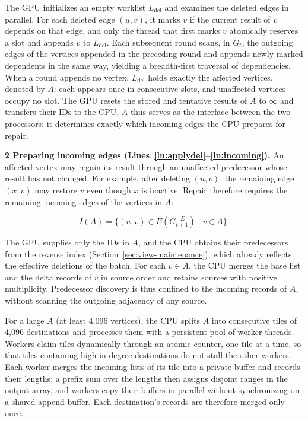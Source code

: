 The GPU initializes an empty worklist $L_{\mathrm{del}}$ and examines the deleted edges in parallel. For each deleted edge $(u,v)$, it marks $v$ if the current result of $v$ depends on that edge, and only the thread that first marks $v$ atomically reserves a slot and appends $v$ to $L_{\mathrm{del}}$. Each subsequent round scans, in $G_t$, the outgoing edges of the vertices appended in the preceding round and appends newly marked dependents in the same way, yielding a breadth-first traversal of dependencies. When a round appends no vertex, $L_{\mathrm{del}}$ holds exactly the affected vertices, denoted by $A$: each appears once in consecutive slots, and unaffected vertices occupy no slot. The GPU resets the stored and tentative results of $A$ to $\infty$ and transfers their IDs to the CPU. $A$ thus serves as the interface between the two processors: it determines exactly which incoming edges the CPU prepares for repair.

\textbf{2 Preparing incoming edges (Lines~\ref{ln:applydel}--\ref{ln:incoming}).} An affected vertex may regain its result through an unaffected predecessor whose result has not changed. For example, after deleting $(u,v)$, the remaining edge $(x,v)$ may restore $v$ even though $x$ is inactive. Repair therefore requires the remaining incoming edges of the vertices in $A$:

\begin{equation}
I(A)=\{(u,v)\in E(G_{t+1}^{-E})\mid v\in A\}.
\end{equation}

The GPU supplies only the IDs in $A$, and the CPU obtains their predecessors from the reverse index (Section~\ref{sec:view-maintenance}), which already reflects the effective deletions of the batch. For each $v\in A$, the CPU merges the base list and the delta records of $v$ in source order and retains sources with positive multiplicity. Predecessor discovery is thus confined to the incoming records of $A$, without scanning the outgoing adjacency of any source.

For a large $A$ (at least 4,096 vertices), the CPU splits $A$ into consecutive tiles of 4,096 destinations and processes them with a persistent pool of worker threads. Workers claim tiles dynamically through an atomic counter, one tile at a time, so that tiles containing high in-degree destinations do not stall the other workers. Each worker merges the incoming lists of its tile into a private buffer and records their lengths; a prefix sum over the lengths then assigns disjoint ranges in the output array, and workers copy their buffers in parallel without synchronizing on a shared append buffer. Each destination's records are therefore merged only once.

